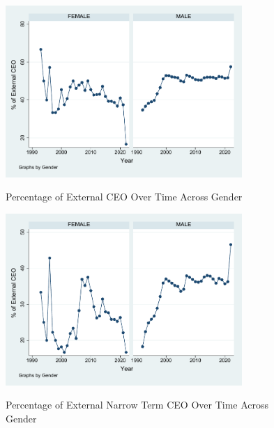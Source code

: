 \documentclass[12pt]{article}
\begin{document}
\begin{figure}[!htb]
\caption{Percentage of External CEO Over Time Across Gender \label{fig:pc_external_gender}}
\centering
\includegraphics[width=0.8\textwidth]{gph/pc_external_gender.pdf} 
{\scriptsize
}
\end{figure}
\begin{figure}[!htb]
\caption{Percentage of External Narrow Term CEO Over Time Across Gender \label{fig:pc_external_gender_ceo}}
\centering
\includegraphics[width=0.8\textwidth]{gph/pc_external_gender_ceo.pdf} 
{\scriptsize
}
\end{figure}
\clearpage


\end{document}
